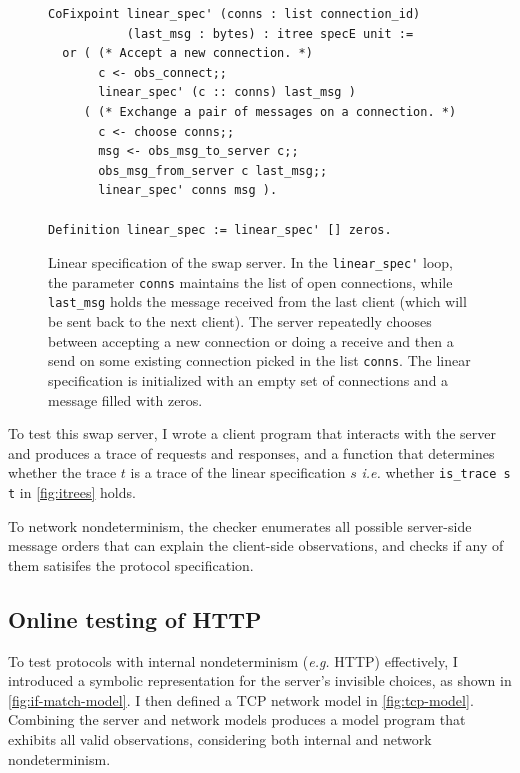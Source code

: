 \documentclass[12pt,oneside]{amsbook}
\newcommand{\ilc}[1]{\lstinline[style=customcoq]{#1}}
\numberwithin{section}{chapter}
\numberwithin{figure}{chapter}
\numberwithin{equation}{chapter}
\begin{document}
\begin{figure}
\begin{lstlisting}[style=customcoq]
CoFixpoint linear_spec' (conns : list connection_id)
           (last_msg : bytes) : itree specE unit :=
  or ( (* Accept a new connection. *)
       c <- obs_connect;;
       linear_spec' (c :: conns) last_msg )
     ( (* Exchange a pair of messages on a connection. *)
       c <- choose conns;;
       msg <- obs_msg_to_server c;;
       obs_msg_from_server c last_msg;;
       linear_spec' conns msg ).

Definition linear_spec := linear_spec' [] zeros.
\end{lstlisting}
\caption{Linear specification of the swap server.  In the \ilc{linear_spec'}
  loop, the parameter \ilc{conns} maintains the list of open connections, while
  \ilc{last_msg} holds the message received from the last client (which will be
  sent back to the next client).  The server repeatedly chooses between
  accepting a new connection or doing a receive and then a send on some existing
  connection picked in the list \ilc{conns}.  The linear specification is
  initialized with an empty set of connections and a message filled with zeros.}
\label{fig:linear-spec}
\end{figure}

To test this swap server, I wrote a client program that interacts with the
server and produces a trace of requests and responses, and a function that
determines whether the trace $t$ is a trace of the linear specification $s$ {\it
  i.e.} whether \ilc{is_trace s t} in \autoref{fig:itrees} holds.

To network nondeterminism, the checker enumerates all possible server-side
message orders that can explain the client-side observations, and checks if any
of them satisifes the protocol specification.

\subsection{Online testing of HTTP}
To test protocols with internal nondeterminism ({\it e.g.} HTTP) effectively, I
introduced a symbolic representation for the server's invisible choices, as
shown in \autoref{fig:if-match-model}.  I then defined a TCP network model in
\autoref{fig:tcp-model}.  Combining the server and network models produces a
model program that exhibits all valid observations, considering both internal
and network nondeterminism.
\end{document}
